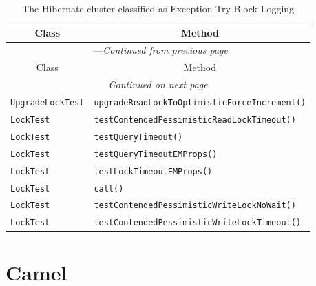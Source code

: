 \begin{center}
\begin{longtable}{ll}
\caption{The Hibernate cluster classified as Exception Try-Block Logging}\\
\toprule\multicolumn{1}{c}{Class}&\multicolumn{1}{c}{Method}\\\midrule
\endfirsthead

\multicolumn{2}{c}{\tablename\ \thetable{}---\textit{Continued from previous page}} \\\midrule
\multicolumn{1}{c}{Class}&\multicolumn{1}{c}{Method}\\\midrule
\endhead
\multicolumn{2}{c}{\textit{Continued on next page}}\\\midrule
\endfoot
\bottomrule
\endlastfoot

\lstinline/UpgradeLockTest/&{\lstinline/upgradeReadLockToOptimisticForceIncrement()/}\\
\lstinline/LockTest/&{\lstinline/testContendedPessimisticReadLockTimeout()/}\\
\lstinline/LockTest/&{\lstinline/testQueryTimeout()/}\\
\lstinline/LockTest/&{\lstinline/testQueryTimeoutEMProps()/}\\
\lstinline/LockTest/&{\lstinline/testLockTimeoutEMProps()/}\\
\lstinline/LockTest/&{\lstinline/call()/}\\
\lstinline/LockTest/&{\lstinline/testContendedPessimisticWriteLockNoWait()/}\\
\lstinline/LockTest/&{\lstinline/testContendedPessimisticWriteLockTimeout()/}\\
\end{longtable}
\end{center}

\section{Camel}\label{camel}

